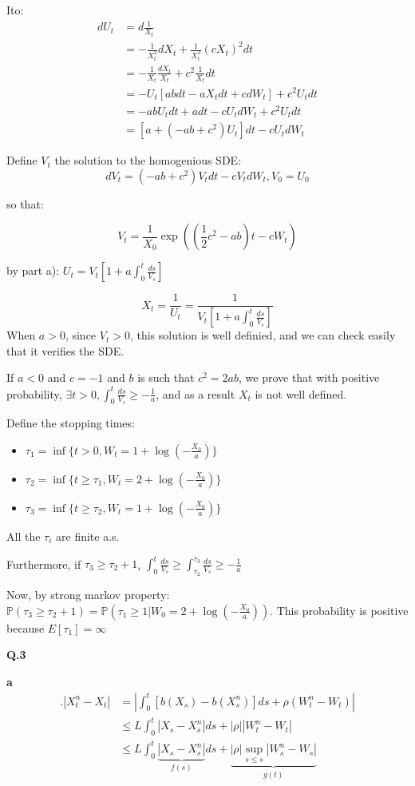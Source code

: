 \documentclass[11pt]{article}
\begin{document}
Ito:
\begin{align*}
dU_t
&=d\frac1{X_t}
\\&= -\frac1{X_t^2}dX_t + \frac1{X_t^3}(cX_t)^2dt
\\&= -\frac1{X_t} \frac{dX_t}{X_t} +  c^2\frac1{X_t} dt
\\&= -U_t [ab dt - aX_t dt + c dW_t] +  c^2U_t dt
\\&=  -abU_t dt + a dt - c U_tdW_t +  c^2U_t dt
\\&=  \left[a + (-ab + c^2) U_t\right] dt  - c U_t dW_t 
\end{align*}

Define \(V_t\) the solution to the homogenious SDE:
$$dV_t = (-ab + c^2)V_t dt - cV_t dW_t, V_0 = U_0$$

so that:

\[V_t= \frac1{X_0} \exp\left((\frac12 c^2 - ab) t - c W_t\right) \]

by part a):
\(U_t = V_t\left[1 + a \int_0^t \frac{ds}{V_s}\right]\)


\[X_t = \frac1{U_t} = \frac1{V_t\left[ 1 + a \int_0^t \frac{ds}{V_s}\right]}\]
When \(a > 0\), since \(V_t > 0\), this solution is well definied, and we can check easily that it verifies the SDE.

If \(a < 0\) and \(c = -1\) and \(b\) is such that \(c^2 = 2ab\), we prove that with positive probability, \(\exists t > 0, \int_0^t \frac{ds}{V_s} \ge -\frac1a\), and as a result \(X_t\) is not well defined.

Define the stopping times:
\begin{itemize}
\item \(\tau_1 = \inf\{ t > 0, W_t = 1 + \log(-\frac{X_0}a) \}\)
\item \(\tau_2 = \inf\{ t \ge \tau_1, W_t = 2+ \log(-\frac{X_0}a)\}\)
\item \(\tau_3 = \inf\{ t \ge \tau_2, W_t = 1+ \log(-\frac{X_0}a) \}\)
\end{itemize}

All the \(\tau_i\) are finite a.s.

Furthermore, if \(\tau_3 \ge \tau_2 +1\), \(\int_0^t \frac{ds}{V_s} \ge \int_{\tau_2}^{\tau_3} \frac{ds}{V_s} \ge -\frac1a\)

Now, by strong markov property: \(\mathbb P(\tau_3 \ge \tau_2 + 1) = \mathbb P(\tau_1 \ge 1 | W_0 = 2 + \log(- \frac{X_0}a))\). This probability is positive because \(E[\tau_1] = \infty\)

\textbf{Q.3}

\textbf{a}
\begin{align*}
.|X_t^n - X_t| &= |\int_0^t [b(X_s) - b(X^n_s)] ds + \rho (W^n_t - W_t)|
\\&\le L \int_0^t |X_s - X^n_s| ds + |\rho| |W^n_t - W_t|
\\&\le L \int_0^t \underbrace{|X_s - X^n_s|}_{f(s)} ds + \underbrace{|\rho| \sup_{s \le s} |W^n_s - W_s|}_{g(t)}
\end{align*}
\end{document}
